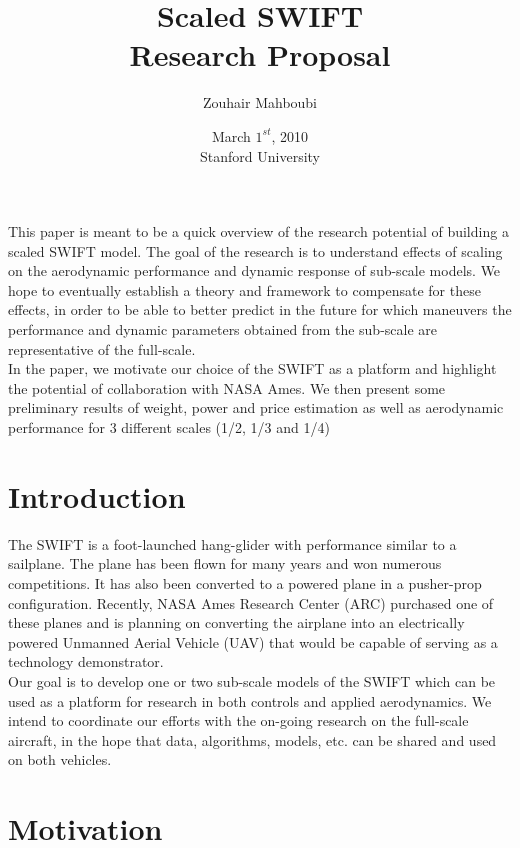 \documentclass[titlepage,10pt]{article}
\begin{document}
\title{
Scaled SWIFT \\
Research Proposal
}

\author{Zouhair Mahboubi}

\date{March $1^{st}$, 2010\\ Stanford University}

\maketitle
\newpage

\abstract
This paper is meant to be a quick overview of the research potential of building a scaled SWIFT model. The goal of the research is to understand effects of scaling on the aerodynamic performance and dynamic response of sub-scale models. We hope to eventually establish a theory and framework to compensate for these effects, in order to be able to better predict in the future for which maneuvers the performance and dynamic parameters obtained from the sub-scale are representative of the full-scale. \\

In the paper, we motivate our choice of the SWIFT as a platform and highlight the potential of collaboration with NASA Ames. We then present some preliminary results of weight, power and price estimation as well as aerodynamic performance for 3 different scales (1/2, 1/3 and 1/4) 

\newpage
\section{Introduction}
The SWIFT is a foot-launched hang-glider with performance similar to a sailplane. The plane has been flown for many years and won numerous competitions. It has also been converted to a powered plane in a pusher-prop configuration. Recently, NASA Ames Research Center (ARC) purchased one of these planes and is planning on converting the airplane into an electrically powered Unmanned Aerial Vehicle (UAV) that would be capable of serving as a technology demonstrator.\\
Our goal is to develop one or two sub-scale models of the SWIFT which can be used as a platform for research in both controls and applied aerodynamics. We intend to coordinate our efforts with the on-going research on the full-scale aircraft, in the hope that data, algorithms, models, etc. can be shared and used on both vehicles.

\section{Motivation}
\end{document}
